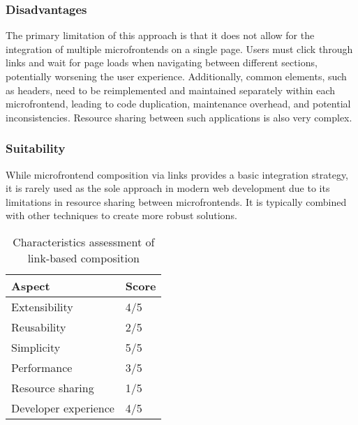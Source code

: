\subsubsection{Disadvantages}
The primary limitation of this approach is that it does not allow for the integration of multiple microfrontends on a single page. Users must click through links and wait for page loads when navigating between different sections, potentially worsening the user experience.  Additionally, common elements, such as headers, need to be reimplemented and  maintained separately within each microfrontend, leading to code duplication, maintenance overhead, and potential inconsistencies. Resource sharing between such applications is also very complex. \cite{Geers}

\subsubsection{Suitability}
While microfrontend composition via links provides a basic integration strategy, it is rarely used as the sole approach in modern web development due to its limitations in resource sharing between microfrontends. It is typically combined with other techniques to create more robust solutions. \cite{Geers}

\begin{table}[h]
   \centering
   \begin{tabular}{|l|l|}
      \hline
         \textbf{Aspect} & \textbf{Score} \\
      \hline
         Extensibility & 4/5 \\
      \hline
         Reusability & 2/5 \\
      \hline
         Simplicity & 5/5 \\
      \hline
         Performance & 3/5 \\
      \hline
         Resource sharing & 1/5 \\
      \hline
         Developer experience & 4/5 \\
      \hline
   \end{tabular}
   \caption{Characteristics assessment of link-based composition}
   \label{table:links-composition}
\end{table}